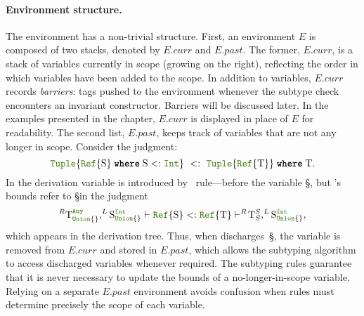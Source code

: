 \paragraph{Environment structure.}
The environment has a non-trivial structure.  First, an
environment $E$ is composed of two stacks, denoted by
$E.curr$ and $E.past$.  The former, $E.curr$, is a
stack of variables currently in scope (growing on the right),
reflecting the order in which variables have been added to the scope.
In addition to variables, $E.curr$ records \emph{barriers}: tags pushed
to the environment whenever the subtype check encounters an invariant
constructor.  Barriers will be discussed later.
In the examples presented in the chapter, $E.curr$ is displayed in place of $E$
for readability. The second list, $E.past$,
keeps track of variables that are not any longer in scope.  Consider
the judgment:
\[
    \tupletyp{\wheret{\cstrt{\jlname{Ref}}{\S}}{\S <: \jlname{Int}}} \ <:\ 
    \wheret{\tupletyp{\cstrt{\jlname{Ref}}{\T}}}{\T}.
\]
In the derivation variable \T is introduced by~ rule---before
the variable \S, but \T's bounds refer to \S in the judgment
\[ ^R \T_{\uniontyp{}}^{\anytyp}, ^L \S_{\uniontyp{}}^{\jlname{Int}} \vdash
   \cstrt{\jlname{Ref}}{\S} <: \cstrt{\jlname{Ref}}{\T} \vdash 
   ^R\!\T_S^S, ^L \S_{\uniontyp{}}^{\jlname{Int}}, \]
which appears in the derivation tree.
Thus, when  discharges~\S, the variable is removed from 
\(E.curr\) and stored in \(E.past\), which allows the subtyping algorithm
to access discharged variables whenever required. 
The subtyping rules guarantee that it is never necessary to
update the bounds of a no-longer-in-scope variable.  Relying on a
separate \(E.past\) environment avoids confusion when rules must
determine precisely the scope of each variable.


